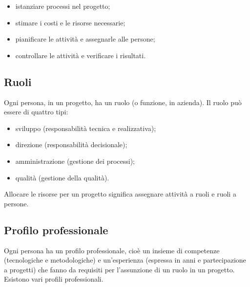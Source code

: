\documentclass[a4paper]{article}
\begin{document}
	\begin{itemize}
		
			
	\item istanziare processi nel progetto;
			
	\item stimare i costi e le risorse necessarie;
			
	\item pianificare le attività e assegnarle alle persone;
			
	\item controllare le attività e verificare i risultati.
		
	\end{itemize}


		
	\subsection{Ruoli}

		
Ogni persona, in un progetto, ha un ruolo (o funzione, in azienda). Il ruolo può essere di quattro tipi:
		
	\begin{itemize}
		
			
	\item sviluppo (responsabilità tecnica e realizzativa);
			
	\item direzione (responsabilità decisionale);
			
	\item amministrazione (gestione dei processi);
			
	\item qualità (gestione della qualità).
		
	\end{itemize}

		
Allocare le risorse per un progetto significa assegnare attività a ruoli e ruoli a persone.

		
	\subsection{Profilo professionale}

		
Ogni persona ha un profilo professionale, cioè un insieme di competenze (tecnologiche e metodologiche) e un'esperienza (espressa in anni e partecipazione a progetti) che fanno da requisiti per l'assunzione di un ruolo in un progetto. Esistono vari profili professionali.
		
\end{document}
